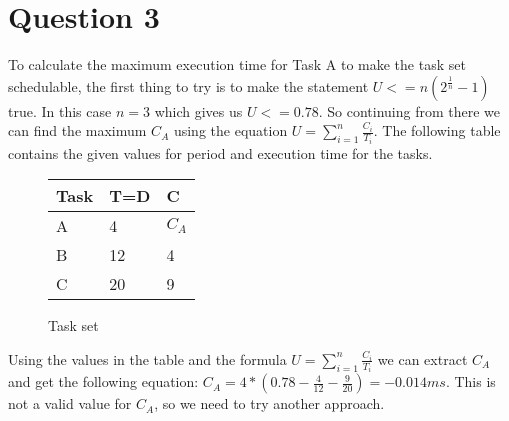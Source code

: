 \section{Question 3}

    To calculate the maximum execution time for Task A to make the task set schedulable, the first thing to try is to make the statement $U <= n(2^{\frac{1}{n}} - 1)$ true. In this case $n = 3$ which gives us $U <= 0.78$. So continuing from there we can find the maximum $C_A$ using the equation $U = \sum_{i=1}^{n} \frac{C_i}{T_i}$. The following table contains the given values for period and execution time for the tasks.
    \renewcommand{\arraystretch}{1.4}
        \begin{figure}[H]
        \centering
        \begin{minipage}{0.5\textwidth}
            \begin{table}[H]
            \centering
            \begin{tabular}{|l|l|l|}
                \hline
                \textbf{Task}   & \textbf{T=D}  & \textbf{C}  \\ \hline
                A               & 4             & $C_A$       \\ \hline
                B               & 12            & 4           \\ \hline
                C               & 20            & 9           \\ \hline
            \end{tabular}
            \end{table}
        \end{minipage}%
        \caption{Task set}
        \label{fig:Q3tasks}
        \end{figure}
    \renewcommand{\arraystretch}{1.0}

    Using the values in the table and the formula $U = \sum_{i=1}^{n} \frac{C_i}{T_i}$ we can extract $C_A$ and get the following equation: $C_A = 4*(0.78 - \frac{4}{12} - \frac{9}{20}) = -0.014ms$. This is not a valid value for $C_A$, so we need to try another approach.\\
    
